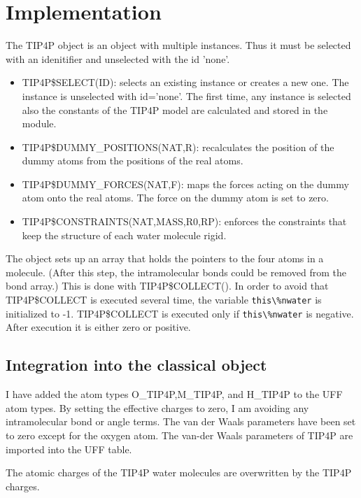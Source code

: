 \documentclass[11pt,a4paper]{report}
\begin{document}
\section{Implementation}
The TIP4P object is an object with multiple instances. Thus it must be
selected with an idenitifier and unselected with the id 'none'.

\begin{itemize}
\item TIP4P\$SELECT(ID): selects an existing instance or creates a new
  one. The instance is unselected with id='none'. The first time, any
  instance is selected also the constants of the TIP4P model are
  calculated and stored in the module.
%
\item TIP4P\$DUMMY\_POSITIONS(NAT,R): recalculates the position of the dummy
  atoms from the positions of the real atoms.
%
\item TIP4P\$DUMMY\_FORCES(NAT,F): maps the forces acting on the dummy atom
  onto the real atoms. The force on  the dummy atom is set to zero.
%
\item TIP4P\$CONSTRAINTS(NAT,MASS,R0,RP): enforces the constraints
  that keep the structure of each water molecule rigid.
\end{itemize}

The object sets up an array that holds the pointers to the four atoms
in a molecule. (After this step, the intramolecular bonds could be
removed from the bond array.) This is done with TIP4P\$COLLECT().  In
order to avoid that TIP4P\$COLLECT is executed several time, the
variable \verb|this\%nwater| is initialized to -1. TIP4P\$COLLECT is
executed only if \verb|this\%nwater| is negative. After execution it
is either zero or positive.

\subsection{Integration into the classical object}

I have added the atom types O\_TIP4P,M\_TIP4P, and H\_TIP4P to the UFF
atom types. By setting the effective charges to zero, I am avoiding
any intramolecular bond or angle terms. The van der Waals parameters
have been set to zero except for the oxygen atom. The van-der Waals
parameters of TIP4P are imported into the UFF table.

The atomic charges of the TIP4P water molecules are overwritten by the
TIP4P charges.
\end{document}

